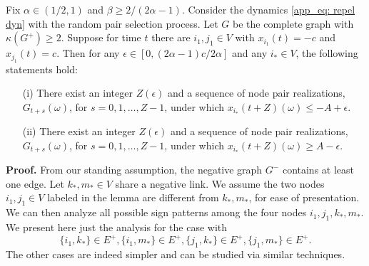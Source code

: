 \begin{lemma}
\label{ap_lemma: appro }
    Fix $\alpha \in (1/2, 1)$ and $\beta \geq 2/(2\alpha - 1)$. Consider the dynamics \ref{app_eq: repel dyn} with the random pair selection process. Let $G$ be the complete graph with $\kappa(G^+) \geq 2$. Suppose for time $t$ there are $i_1, j_1 \in V$ with $x_{i_1}(t) = -c$ and $x_{j_1}(t) = c$. Then for any $\epsilon \in [0, (2\alpha - 1)c/2\alpha]$ and any $i_* \in V$, the following statements hold:
\begin{enumerate}
    \item[(i)] There exist an integer $Z(\epsilon)$ and a sequence of node pair realizations, $G_{t+s}(\omega)$, for $s = 0, 1, \dots, Z - 1$, under which $x_{i_*}(t + Z)(\omega) \leq -A + \epsilon$.
    \item[(ii)] There exist an integer $Z(\epsilon)$ and a sequence of node pair realizations, $G_{t+s}(\omega)$, for $s = 0, 1, \dots, Z - 1$, under which $x_{i_*}(t + Z)(\omega) \geq A - \epsilon$.
\end{enumerate}
\end{lemma} 


\textbf{Proof.} From our standing assumption, the negative graph $G^-$ contains at least one edge. Let $k_*, m_* \in V$ share a negative link. We assume the two nodes $i_1, j_1 \in V$ labeled in the lemma are different from \(k_*, m_*\), for ease of presentation. We can then analyze all possible sign patterns among the four nodes \(i_1, j_1, k_*, m_*\). We present here just the analysis for the case with
\[
\{i_1, k_*\} \in E^+, \{i_1, m_*\} \in E^+, \{j_1, k_*\} \in E^+, \{j_1, m_*\} \in E^+.
\]
The other cases are indeed simpler and can be studied via similar techniques.

